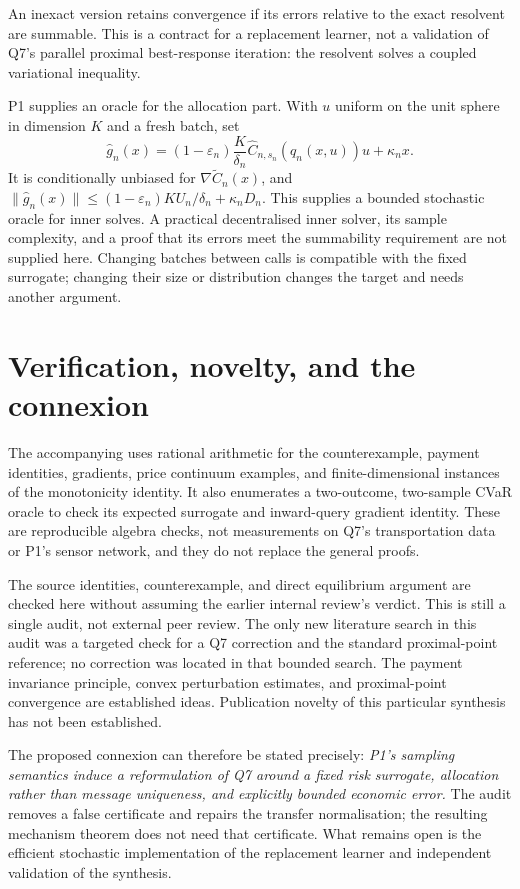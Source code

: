 \documentclass[11pt,a4paper]{article}
\begin{document}
An inexact version retains convergence if its errors relative to the exact
resolvent are summable. This is a contract for a replacement learner, not
a validation of Q7's parallel proximal best-response iteration: the
resolvent solves a coupled variational inequality.

P1 supplies an oracle for the allocation part. With $u$ uniform on the unit
sphere in dimension $K$ and a fresh batch, set
\begin{equation}
 \widehat g_n(x)=
 (1-\varepsilon_n)\frac{K}{\delta_n}
       \widehat C_{n,s_n}(q_n(x,u))u+\kappa_nx.
 \label{eq:oracle}
\end{equation}
It is conditionally unbiased for $\nabla\widetilde C_n(x)$, and
$\|\widehat g_n(x)\|\leq
(1-\varepsilon_n)KU_n/\delta_n+\kappa_nD_n$.
This supplies a bounded stochastic oracle for inner solves. A practical
decentralised inner solver, its sample complexity, and a proof that its
errors meet the summability requirement are not supplied here. Changing
batches between calls is compatible with the fixed surrogate; changing
their size or distribution changes the target and needs another argument.

\section{Verification, novelty, and the connexion}

The accompanying  uses rational arithmetic for the
counterexample, payment identities, gradients, price continuum examples,
and finite-dimensional instances of the monotonicity identity. It also
enumerates a two-outcome, two-sample CVaR oracle to check its expected
surrogate and inward-query gradient identity. These are reproducible
algebra checks, not measurements on Q7's transportation data or P1's sensor
network, and they do not replace the general proofs.

The source identities, counterexample, and direct equilibrium argument are
checked here without assuming the earlier internal review's verdict. This
is still a single audit, not external peer review. The only new literature
search in this audit was a targeted check for a Q7 correction and the
standard proximal-point reference; no correction was located in that bounded
search. The payment invariance principle, convex perturbation estimates,
and proximal-point convergence are established ideas. Publication novelty
of this particular synthesis has not been established.

The proposed connexion can therefore be stated precisely: \emph{P1's
sampling semantics induce a reformulation of Q7 around a fixed risk
surrogate, allocation rather than message uniqueness, and explicitly
bounded economic error.} The audit removes a false certificate and repairs
the transfer normalisation; the resulting mechanism theorem does not need
that certificate. What remains open is the efficient stochastic implementation
of the replacement learner and independent validation of the synthesis.
\end{document}
